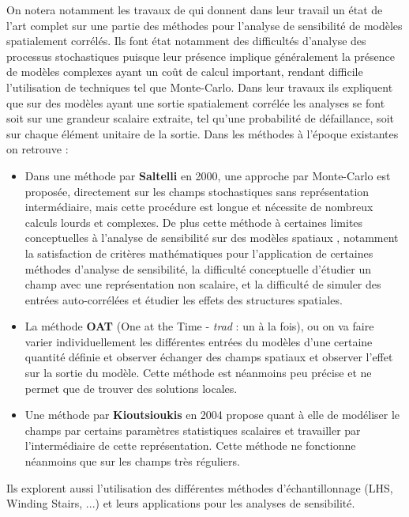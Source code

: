 \documentclass[a4paper,10pt]{article}
\begin{document}
On notera notamment les travaux de \cite{Lilburne2009Feb} qui donnent dans leur travail un état de l'art complet sur une partie des méthodes pour l'analyse de sensibilité de modèles spatialement corrélés. Ils font état notamment des difficultés d'analyse des processus stochastiques puisque leur présence implique généralement la présence de modèles complexes ayant un coût de calcul important,  rendant difficile l'utilisation de techniques tel que Monte-Carlo. Dans leur travaux ils expliquent que sur des modèles ayant une sortie spatialement corrélée les analyses se font soit sur une grandeur scalaire extraite, tel qu'une probabilité de défaillance, soit sur chaque élément unitaire de la sortie. Dans les méthodes à l'époque existantes on retrouve :
\begin{itemize}
\item Dans une méthode par \textbf{Saltelli} en 2000, une approche par Monte-Carlo est proposée, directement sur les champs stochastiques sans représentation intermédiaire, mais cette procédure est longue et nécessite de nombreux calculs lourds et complexes. De plus cette méthode à certaines limites conceptuelles à l'analyse de sensibilité sur des modèles spatiaux , notamment la satisfaction de critères mathématiques pour l'application de certaines méthodes d'analyse de sensibilité, la difficulté conceptuelle d'étudier un champ avec une représentation non scalaire, et la difficulté de simuler des entrées auto-corrélées et étudier les effets des structures spatiales. 

\item La méthode \textbf{OAT} (One at the Time - \textit{trad} : un à la fois), ou on va faire varier individuellement les différentes entrées du modèles d'une certaine quantité définie et observer échanger des champs spatiaux et observer l'effet sur la sortie du modèle. Cette méthode est néanmoins peu précise et ne permet que de trouver des solutions locales.

\item Une méthode par \textbf{Kioutsioukis} en 2004 propose quant à elle de modéliser le champs par certains paramètres statistiques scalaires et travailler par l’intermédiaire de cette représentation. Cette méthode ne fonctionne néanmoins que sur les champs très réguliers. 
\end{itemize}

Ils explorent aussi l'utilisation des différentes méthodes d’échantillonnage (LHS, Winding Stairs, ...) et leurs applications pour les analyses de sensibilité. \par \smallskip
\end{document}
